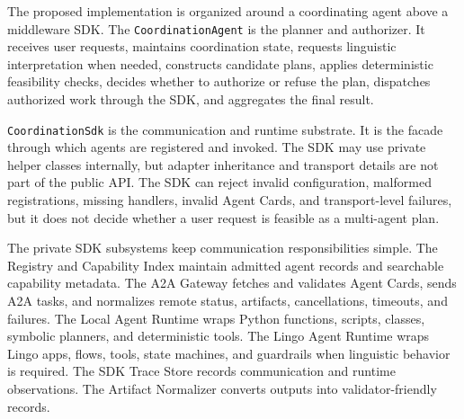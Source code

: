 The proposed implementation is organized around a coordinating agent above a middleware SDK. The \texttt{CoordinationAgent} is the planner and authorizer. It receives user requests, maintains coordination state, requests linguistic interpretation when needed, constructs candidate plans, applies deterministic feasibility checks, decides whether to authorize or refuse the plan, dispatches authorized work through the SDK, and aggregates the final result.

\texttt{CoordinationSdk} is the communication and runtime substrate. It is the facade through which agents are registered and invoked. The SDK may use private helper classes internally, but adapter inheritance and transport details are not part of the public API. The SDK can reject invalid configuration, malformed registrations, missing handlers, invalid Agent Cards, and transport-level failures, but it does not decide whether a user request is feasible as a multi-agent plan.

The private SDK subsystems keep communication responsibilities simple. The Registry and Capability Index maintain admitted agent records and searchable capability metadata. The A2A Gateway fetches and validates Agent Cards, sends A2A tasks, and normalizes remote status, artifacts, cancellations, timeouts, and failures. The Local Agent Runtime wraps Python functions, scripts, classes, symbolic planners, and deterministic tools. The Lingo Agent Runtime wraps Lingo apps, flows, tools, state machines, and guardrails when linguistic behavior is required. The SDK Trace Store records communication and runtime observations. The Artifact Normalizer converts outputs into validator-friendly records.

